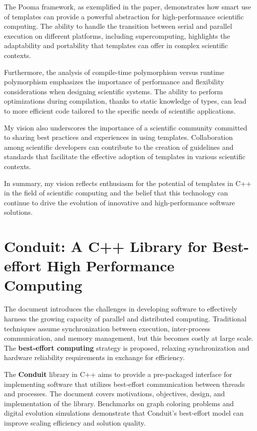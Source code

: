 \documentclass[11pt]{article}
\begin{document}
\begin{multicols*}{2}[\columnsep=1cm]
        The Pooma framework, as exemplified in the paper, demonstrates how smart use of templates can provide a powerful abstraction for high-performance scientific computing. The ability to handle the transition between serial and parallel execution on different platforms, including supercomputing, highlights the adaptability and portability that templates can offer in complex scientific contexts.
        
        Furthermore, the analysis of compile-time polymorphism versus runtime polymorphism emphasizes the importance of performance and flexibility considerations when designing scientific systems. The ability to perform optimizations during compilation, thanks to static knowledge of types, can lead to more efficient code tailored to the specific needs of scientific applications.
        
        My vision also underscores the importance of a scientific community committed to sharing best practices and experiences in using templates. Collaboration among scientific developers can contribute to the creation of guidelines and standards that facilitate the effective adoption of templates in various scientific contexts.

        In summary, my vision reflects enthusiasm for the potential of templates in C++ in the field of scientific computing and the belief that this technology can continue to drive the evolution of innovative and high-performance software solutions.
\newpage
\section{Conduit: A C++ Library for Best-effort High Performance Computing}
    The document introduces the challenges in developing software to effectively harness the growing capacity of parallel and distributed computing. Traditional techniques assume synchronization between execution, inter-process communication, and memory management, but this becomes costly at large scale. The \textbf{best-effort computing} strategy is proposed, relaxing synchronization and hardware reliability requirements in exchange for efficiency.
    
    The \textbf{Conduit} library in C++ aims to provide a pre-packaged interface for implementing software that utilizes best-effort communication between threads and processes. The document covers motivations, objectives, design, and implementation of the library. Benchmarks on graph coloring problems and digital evolution simulations demonstrate that Conduit's best-effort model can improve scaling efficiency and solution quality.
    

\end{multicols*}
\end{document}

